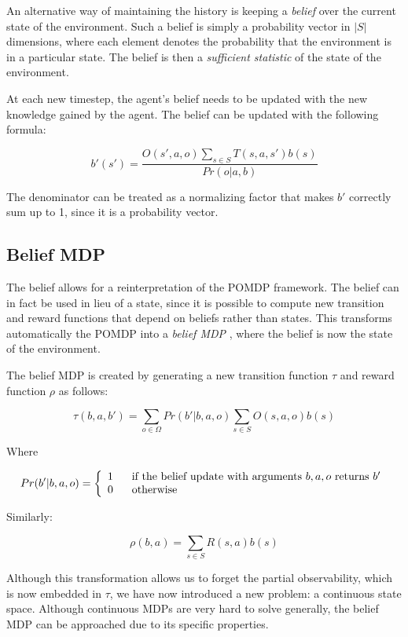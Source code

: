 An alternative way of maintaining the history is keeping a \textit{belief} over the current state of
the environment. Such a belief is simply a probability vector in $|S|$ dimensions, where each
element denotes the probability that the environment is in a particular state. The belief is then a
\textit{sufficient statistic} of the state of the environment.

At each new timestep, the agent's belief needs to be updated with the new knowledge gained by the
agent. The belief can be updated with the following formula:

\[ b'(s') = \frac{O(s', a, o)\sum_{s\in S}T(s,a,s')b(s)}{Pr(o|a,b)} \]

The denominator can be treated as a normalizing factor that makes $b'$ correctly sum up to 1, since
it is a probability vector.

\subsection{Belief MDP}

The belief allows for a reinterpretation of the POMDP framework. The belief can in fact be used in
lieu of a state, since it is possible to compute new transition and reward functions that depend on
beliefs rather than states. This transforms automatically the POMDP into a \textit{belief MDP}
\cite{cit:pomdp}, where the belief is now the state of the environment.

The belief MDP is created by generating a new transition function $\tau$ and reward function $\rho$
as follows:

\[ \tau(b,a,b') = \sum_{o\in \Omega} Pr(b' | b, a, o) \sum_{s\in S} O(s,a,o) b(s) \]

Where

\[Pr(b' | b, a, o) = \left\{
  \begin{array}{lr}
    1 \hspace{.6cm}\text{if the belief update with arguments $b,a,o$ returns $b'$}\\
    0 \hspace{.6cm}\text{otherwise}
  \end{array}
\right.
\]

Similarly:

\[ \rho(b,a) = \sum_{s\in S} R(s,a) b(s) \]

Although this transformation allows us to forget the partial observability, which is now embedded in
$\tau$, we have now introduced a new problem: a continuous state space. Although continuous MDPs are
very hard to solve generally, the belief MDP can be approached due to its specific properties.

